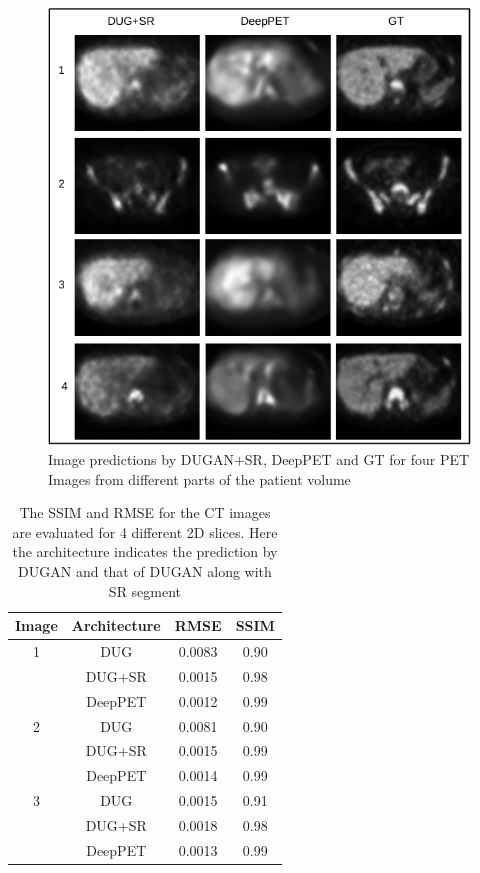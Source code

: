 \begin{figure}[!htbp]
	\centering
	\includegraphics[width=0.7\linewidth]{./Figures/PET_with_dp-crop.pdf}
	\caption{Image predictions by \ac{DUGAN}+SR, DeepPET and \ac{GT} for four \ac{PET} Images from different parts of the patient volume}
	\label{fig:PET_results}
\end{figure}


\begin{table}[h!]
	\centering
	\caption{The \ac{SSIM} and \ac{RMSE} for the \ac{CT} images are evaluated for 4 different \ac{2D} slices. Here the architecture indicates the prediction by \ac{DUGAN} and that of \ac{DUGAN} along with \ac{SR} segment}
	\label{table:4}
	\begin{tabular}{||c|c|c|c||} 
		\hline
		Image & Architecture & \ac{RMSE} & \ac{SSIM} \\ [0.5ex] 
		\hline\hline
		1 & DUG & 0.0083 & 0.90 \\ 
		& DUG+SR & 0.0015 & 0.98 \\
		& DeepPET & 0.0012 & 0.99 \\
		\hline
		2 & DUG &  0.0081 & 0.90 \\ 
		& DUG+SR & 0.0015 & 0.99 \\
		& DeepPET & 0.0014 & 0.99 \\
		\hline
		3 & DUG & 0.0015 & 0.91 \\ 
		& DUG+SR & 0.0018 & 0.98 \\
		& DeepPET & 0.0013 & 0.99 \\  
		\hline  
	\end{tabular}
	
\end{table}




